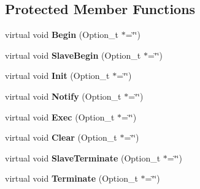 \subsection*{Protected Member Functions}
\begin{DoxyCompactItemize}
\item 
\hypertarget{class_h_a_l_1_1_algorithm_a6273512af97092a7e50955cb69776d82}{virtual void {\bfseries Begin} (Option\+\_\+t $\ast$=\char`\"{}\char`\"{})}\label{class_h_a_l_1_1_algorithm_a6273512af97092a7e50955cb69776d82}

\item 
\hypertarget{class_h_a_l_1_1_algorithm_a468feb5807252729c62cce7db7d60b1d}{virtual void {\bfseries Slave\+Begin} (Option\+\_\+t $\ast$=\char`\"{}\char`\"{})}\label{class_h_a_l_1_1_algorithm_a468feb5807252729c62cce7db7d60b1d}

\item 
\hypertarget{class_h_a_l_1_1_algorithm_abe2da2ce6a2d3ccfb492d8afd1d07331}{virtual void {\bfseries Init} (Option\+\_\+t $\ast$=\char`\"{}\char`\"{})}\label{class_h_a_l_1_1_algorithm_abe2da2ce6a2d3ccfb492d8afd1d07331}

\item 
\hypertarget{class_h_a_l_1_1_algorithm_acbbfee57e6c71ab04047dca6636f2c4f}{virtual void {\bfseries Notify} (Option\+\_\+t $\ast$=\char`\"{}\char`\"{})}\label{class_h_a_l_1_1_algorithm_acbbfee57e6c71ab04047dca6636f2c4f}

\item 
\hypertarget{class_h_a_l_1_1_algorithm_a438c5c54698aa014b660474d08703bc2}{virtual void {\bfseries Exec} (Option\+\_\+t $\ast$=\char`\"{}\char`\"{})}\label{class_h_a_l_1_1_algorithm_a438c5c54698aa014b660474d08703bc2}

\item 
\hypertarget{class_h_a_l_1_1_algorithm_a2a26a5549e92efaa968763ac51e6758a}{virtual void {\bfseries Clear} (Option\+\_\+t $\ast$=\char`\"{}\char`\"{})}\label{class_h_a_l_1_1_algorithm_a2a26a5549e92efaa968763ac51e6758a}

\item 
\hypertarget{class_h_a_l_1_1_algorithm_a9735cc4d7ef34d440aff116c8dbf5cbb}{virtual void {\bfseries Slave\+Terminate} (Option\+\_\+t $\ast$=\char`\"{}\char`\"{})}\label{class_h_a_l_1_1_algorithm_a9735cc4d7ef34d440aff116c8dbf5cbb}

\item 
\hypertarget{class_h_a_l_1_1_algorithm_ab974f3b6336b7b1002c72c04ad2b59cb}{virtual void {\bfseries Terminate} (Option\+\_\+t $\ast$=\char`\"{}\char`\"{})}\label{class_h_a_l_1_1_algorithm_ab974f3b6336b7b1002c72c04ad2b59cb}

\end{DoxyCompactItemize}

